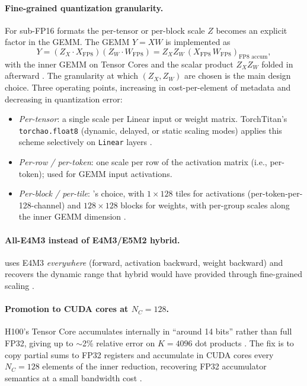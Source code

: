 \paragraph{Fine-grained quantization granularity.} For sub-FP16
formats the per-tensor or per-block scale $Z$ becomes an explicit
factor in the GEMM. The  GEMM $Y = X W$ is implemented as
\begin{equation}
Y = (Z_X \cdot X_{\text{FP8}}) (Z_W \cdot W_{\text{FP8}})
  = Z_X Z_W \, (X_{\text{FP8}} \, W_{\text{FP8}})_{\text{FP8 accum}},
\label{eq:fp8-gemm}
\end{equation}
with the inner GEMM on  Tensor Cores and the scalar product
$Z_X Z_W$ folded in afterward \citep[\S 3.3.2, eq.\ 2]{deepseek-v3}.
The granularity at which $(Z_X, Z_W)$ are chosen is the main design
choice. Three operating points, increasing in cost-per-element of
metadata and decreasing in quantization error:
\begin{itemize}
\item \emph{Per-tensor}: a single scale per Linear input or weight
matrix. TorchTitan's \texttt{torchao.float8} (dynamic, delayed, or
static scaling modes) applies this scheme selectively on
\texttt{Linear} layers \citep[\S 2.2.4]{torchtitan2024}.
\item \emph{Per-row / per-token}: one scale per row of the activation
matrix (i.e., per-token); used for GEMM input activations.
\item \emph{Per-block / per-tile}: 's choice, with $1
\times 128$ tiles for activations (per-token-per-128-channel) and $128
\times 128$ blocks for weights, with per-group scales along the inner
GEMM dimension \citep[\S 3.3.2]{deepseek-v3}.
\end{itemize}

\paragraph{All-E4M3 instead of E4M3/E5M2 hybrid.}  uses
E4M3 \emph{everywhere} (forward, activation backward, weight backward)
and recovers the dynamic range that hybrid would have provided through
fine-grained scaling \citep[\S 3.3.2]{deepseek-v3}.

\paragraph{Promotion to CUDA cores at $N_C = 128$.} H100's  Tensor
Core accumulates internally in ``around 14 bits'' rather than full
FP32, giving up to $\sim$2\% relative error on $K = 4096$ dot products
\citep[\S 3.3.2]{deepseek-v3}. The fix is to copy partial sums to
FP32 registers and accumulate in CUDA cores every $N_C = 128$
elements of the inner reduction, recovering FP32 accumulator semantics
at a small bandwidth cost \citep[\S 3.3.2]{deepseek-v3}.

